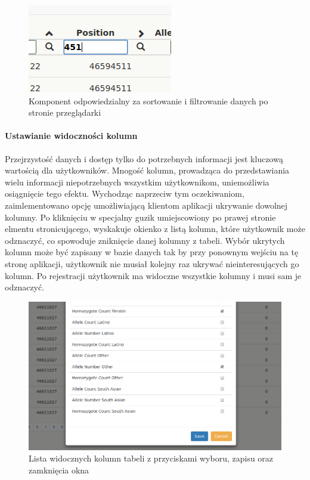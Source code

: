 \documentclass[a4paper,12pt,twoside]{article}
\begin{document}
\begin{figure}[h]
\centering
\includegraphics{obrazy/aplikacja/sortingAndSearch.png}
\caption{Komponent odpowiedzialny za sortowanie i filtrowanie danych po stronie przeglądarki}
\label{fig:sortingAndSearchpic}
\end{figure}

\newpage
\paragraph{Ustawianie widoczności kolumn}
Przejrzystość danych i dostęp tylko do potrzebnych informacji jest kluczową wartością dla użytkowników.
Mnogość kolumn, prowadząca do przedstawiania wielu informacji niepotrzebnych
wszystkim użytkownikom, uniemożliwia osiągnięcie tego efektu. Wychodząc naprzeciw tym oczekiwaniom,
zaimlementowano opcję umożliwiającą klientom aplikacji ukrywanie dowolnej kolumny.
Po kliknięciu w specjalny guzik umiejscowiony po prawej stronie elmentu stronicującego, wyskakuje okienko z listą kolumn,
które użytkownik może odznaczyć, co spowoduje zniknięcie danej kolumny z tabeli. Wybór ukrytych kolumn może być zapisany
w bazie danych tak by przy ponownym wejściu na tę stronę aplikacji, użytkownik nie musiał
kolejny raz ukrywać nieinteresujących go kolumn. Po rejestracji użytkownik ma widoczne wszystkie
kolumny i musi sam je odznaczyć.

\begin{figure}[h]
\includegraphics[width=\linewidth]{obrazy/aplikacja/visible_columns.png}
\caption{Lista widocznych kolumn tabeli z przyciskami wyboru, zapisu oraz zamknięcia okna}
\label{fig:visible_columnspic}
\end{figure}
\end{document}
